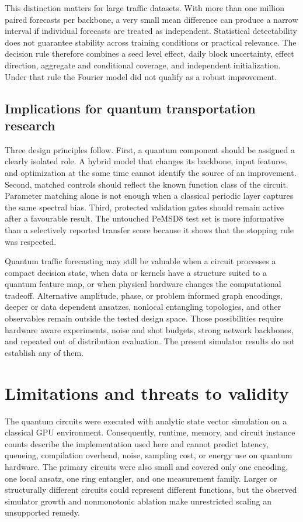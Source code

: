 \documentclass[pdflatex,sn-mathphys-num]{sn-jnl}
\begin{document}
This distinction matters for large traffic datasets. With more than one million paired forecasts per backbone, a very small mean difference can produce a narrow interval if individual forecasts are treated as independent. Statistical detectability does not guarantee stability across training conditions or practical relevance. The decision rule therefore combines a seed level effect, daily block uncertainty, effect direction, aggregate and conditional coverage, and independent initialization. Under that rule the Fourier model did not qualify as a robust improvement.

\subsection{Implications for quantum transportation research}\label{subsec:implications}

Three design principles follow. First, a quantum component should be assigned a clearly isolated role. A hybrid model that changes its backbone, input features, and optimization at the same time cannot identify the source of an improvement. Second, matched controls should reflect the known function class of the circuit. Parameter matching alone is not enough when a classical periodic layer captures the same spectral bias. Third, protected validation gates should remain active after a favourable result. The untouched PeMSD8 test set is more informative than a selectively reported transfer score because it shows that the stopping rule was respected.

Quantum traffic forecasting may still be valuable when a circuit processes a compact decision state, when data or kernels have a structure suited to a quantum feature map, or when physical hardware changes the computational tradeoff. Alternative amplitude, phase, or problem informed graph encodings, deeper or data dependent ansatzes, nonlocal entangling topologies, and other observables remain outside the tested design space. Those possibilities require hardware aware experiments, noise and shot budgets, strong network backbones, and repeated out of distribution evaluation. The present simulator results do not establish any of them.

\section{Limitations and threats to validity}\label{sec:limitations}

The quantum circuits were executed with analytic state vector simulation on a classical GPU environment. Consequently, runtime, memory, and circuit instance counts describe the implementation used here and cannot predict latency, queueing, compilation overhead, noise, sampling cost, or energy use on quantum hardware. The primary circuits were also small and covered only one encoding, one local ansatz, one ring entangler, and one measurement family. Larger or structurally different circuits could represent different functions, but the observed simulator growth and nonmonotonic ablation make unrestricted scaling an unsupported remedy.
\end{document}
